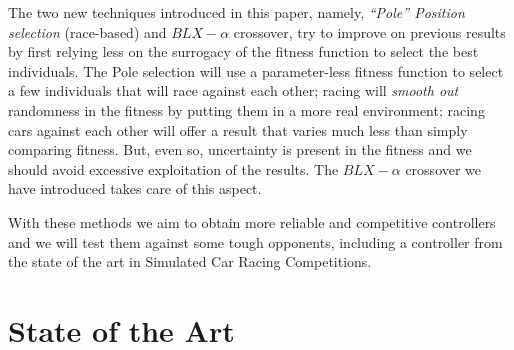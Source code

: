 \documentclass[conference]{IEEEtran}
\begin{document}

The two new techniques introduced in this paper, namely, \textit{``Pole'' Position selection} (race-based) and $BLX-\alpha$ crossover, try to improve on previous results by first relying less on the surrogacy of the fitness function
to select the best individuals. The Pole selection will use a parameter-less fitness function to select a few individuals that will race against each other; racing will {\em smooth out} randomness in the fitness by putting them in a
more real environment; racing cars against each other will offer a
result that varies much less than simply comparing fitness. But, even
so, uncertainty is present in the fitness and we should avoid
excessive exploitation of the results. The $BLX-\alpha$ crossover we
have introduced takes care of this aspect.

With these methods we aim to obtain more reliable and competitive controllers and we will test them against some tough opponents, including a controller from the state of the art in Simulated Car Racing Competitions.



\section{State of the Art}
\label{sec:soa}
\end{document}

